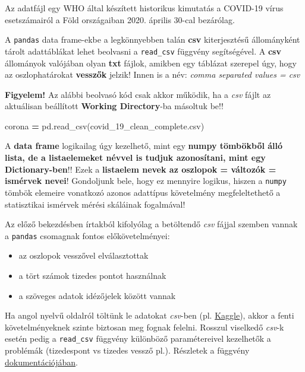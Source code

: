 \documentclass[
]{book}
\newenvironment{Shaded}{\begin{snugshade}}{\end{snugshade}}
\newcommand{\NormalTok}[1]{#1}
\newcommand{\OperatorTok}[1]{\textcolor[rgb]{0.81,0.36,0.00}{\textbf{#1}}}
\newcommand{\StringTok}[1]{\textcolor[rgb]{0.31,0.60,0.02}{#1}}
\providecommand{\tightlist}{%
  \setlength{\itemsep}{0pt}\setlength{\parskip}{0pt}}
\begin{document}
Az adatfájl egy WHO által készített historikus kimutatás a COVID-19 vírus esetszámairól a Föld országaiban 2020. április 30-cal bezárólag.

A \texttt{pandas} data frame-ekbe a legkönnyebben talán \textbf{csv} kiterjesztésű állományként tárolt adattáblákat lehet beolvasni a \texttt{read\_csv} függvény segítségével. A \textbf{csv} állományok valójában olyan \textbf{txt} fájlok, amikben egy táblázat szerepel úgy, hogy az oszlophatárokat \textbf{vesszők} jelzik! Innen is a név: \emph{comma separated values = csv}

\textbf{Figyelem!} Az alábbi beolvasó kód csak akkor működik, ha a \emph{csv} fájlt az aktuálisan beállított \textbf{Working Directory}-ba másoltuk be!!

\begin{Shaded}
\begin{Highlighting}[]
\NormalTok{corona }\OperatorTok{=}\NormalTok{ pd.read\_csv(}\StringTok{\textquotesingle{}covid\_19\_clean\_complete.csv\textquotesingle{}}\NormalTok{)}
\end{Highlighting}
\end{Shaded}

A \textbf{data frame} logikailag úgy kezelhető, mint egy \textbf{numpy tömbökből álló lista, de a listaelemeket névvel is tudjuk azonosítani, mint egy Dictionary-ben}!! Ezek a \textbf{listaelem nevek az oszlopok = változók = ismérvek nevei}! Gondoljunk bele, hogy ez mennyire logikus, hiszen a \texttt{numpy} tömbök elemeire vonatkozó azonos adattípus követelmény megfeleltethető a statisztikai ismérvek mérési skáláinak fogalmával!

Az előző bekezdésben írtakból kifolyólag a betöltendő \emph{csv} fájjal szemben vannak a \texttt{pandas} csomagnak fontos előkövetelményei:

\begin{itemize}
\tightlist
\item
  az oszlopok vesszővel elválasztottak
\item
  a tört számok tizedes pontot használnak
\item
  a szöveges adatok idézőjelek között vannak
\end{itemize}

Ha angol nyelvű oldalról töltünk le adatokat \emph{csv}-ben (pl. \href{https://www.kaggle.com/}{Kaggle}), akkor a fenti követelményeknek szinte biztosan meg fognak felelni.
Rosszul viselkedő \emph{csv}-k esetén pedig a \texttt{read\_csv} függvény különböző paramétereivel kezelhetők a problémák (tizedespont vs tizedes vessző pl.). Részletek a függvény \href{https://pandas.pydata.org/docs/reference/api/pandas.read_csv.html}{dokumentációjában}.
\end{document}
